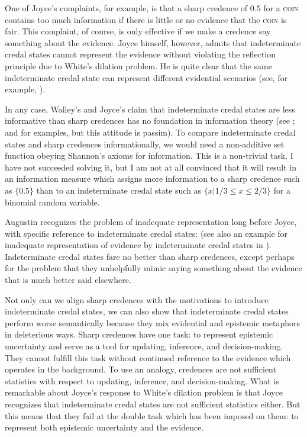 \documentclass[11pt]{article}
\begin{document}
One of Joyce's complaints, for example, is that a sharp credence of
$0.5$ for a \textsc{coin} contains too much information if there is
little or no evidence that the \textsc{coin} is fair. This complaint,
of course, is only effective if we make a credence say something about
the evidence. Joyce himself, however, admits that indeterminate credal
states cannot represent the evidence without violating the reflection
principle due to White's dilation problem. He is quite clear that the
same indeterminate credal state can represent different evidential
scenarios (see, for example, ). 

In any case, Walley's and Joyce's claim that indeterminate credal
states are less informative than sharp credences has no foundation in
information theory (see ; and
 for examples, but this attitude is passim). To
compare indeterminate credal states and sharp credences
informationally, we would need a non-additive set function obeying
Shannon's axioms for information. This is a non-trivial task. I have
not succeeded solving it, but I am not at all convinced that it will
result in an information measure which assigns more information to a
sharp credence such as $\{0.5\}$ than to an indeterminate credal state
such as $\{x|1/3\leq{}x\leq{}2/3\}$ for a binomial random variable.

Augustin recognizes the problem of inadequate representation long
before Joyce, with specific reference to indeterminate credal states:
  (see also an
example for inadequate representation of evidence by indeterminate
credal states in ). Indeterminate credal
states fare no better than sharp credences, except perhaps for the
problem that they unhelpfully mimic saying something about the
evidence that is much better said elsewhere.

Not only can we align sharp credences with the motivations to
introduce indeterminate credal states, we can also show that
indeterminate credal states perform worse semantically because they
mix evidential and epistemic metaphors in deleterious ways. Sharp
credences have one task: to represent epistemic uncertainty and serve
as a tool for updating, inference, and decision-making. They cannot
fulfill this task without continued reference to the evidence which
operates in the background. To use an analogy, credences are not
sufficient statistics with respect to updating, inference, and
decision-making. What is remarkable about Joyce's response to White's
dilation problem is that Joyce recognizes that indeterminate credal
states are not sufficient statistics either. But this means that they
fail at the double task which has been imposed on them: to represent
both epistemic uncertainty and the evidence.
\end{document}
